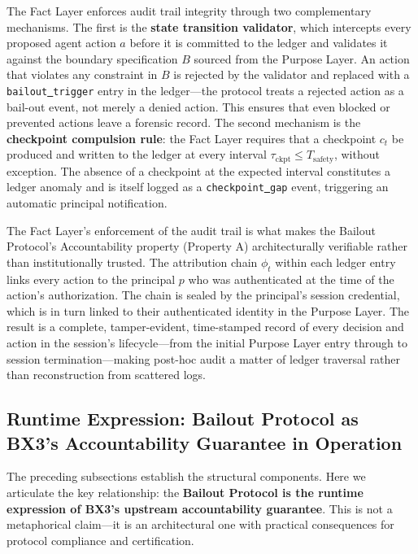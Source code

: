 The Fact Layer enforces audit trail integrity through two complementary mechanisms. The first is the \textbf{state transition validator}, which intercepts every proposed agent action $a$ before it is committed to the ledger and validates it against the boundary specification $B$ sourced from the Purpose Layer. An action that violates any constraint in $B$ is rejected by the validator and replaced with a \texttt{bailout\underline{ }trigger} entry in the ledger—the protocol treats a rejected action as a bail-out event, not merely a denied action. This ensures that even blocked or prevented actions leave a forensic record. The second mechanism is the \textbf{checkpoint compulsion rule}: the Fact Layer requires that a checkpoint $c_t$ be produced and written to the ledger at every interval $\tau_{\text{ckpt}} \leq T_{\text{safety}}$, without exception. The absence of a checkpoint at the expected interval constitutes a ledger anomaly and is itself logged as a \texttt{checkpoint\underline{ }gap} event, triggering an automatic principal notification.

The Fact Layer's enforcement of the audit trail is what makes the Bailout Protocol's Accountability property (Property A) architecturally verifiable rather than institutionally trusted. The attribution chain $\phi_t$ within each ledger entry links every action to the principal $p$ who was authenticated at the time of the action's authorization. The chain is sealed by the principal's session credential, which is in turn linked to their authenticated identity in the Purpose Layer. The result is a complete, tamper-evident, time-stamped record of every decision and action in the session's lifecycle—from the initial Purpose Layer entry through to session termination—making post-hoc audit a matter of ledger traversal rather than reconstruction from scattered logs.

\subsection{Runtime Expression: Bailout Protocol as BX3's Accountability Guarantee in Operation}

The preceding subsections establish the structural components. Here we articulate the key relationship: the \textbf{Bailout Protocol is the runtime expression of BX3's upstream accountability guarantee}. This is not a metaphorical claim—it is an architectural one with practical consequences for protocol compliance and certification.

